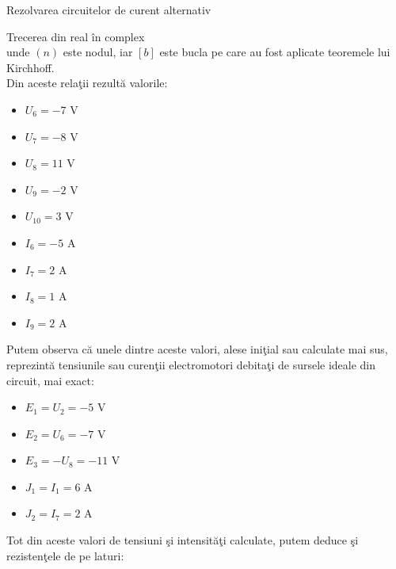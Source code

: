 \documentclass[a4paper]{article}
\begin{document}
\begin{section}{Rezolvarea circuitelor de curent alternativ}
\begin{subsection}{Trecerea din real \^ in complex\\}
unde $ (n) $ este nodul, iar $ [b] $ este bucla pe care au fost aplicate teoremele lui Kirchhoff. \\[0.5cm]
Din aceste rela\c tii rezult\u a valorile: 

\begin{multicols}{2}
\begin{large}
	\begin{itemize}
		\item $ U_6 = -7 $ V
		\item $ U_7 = -8 $ V
		\item $ U_8 = 11 $ V
		\item $ U_9 = -2 $ V
		\item $ U_{10} = 3 $ V

		\item $ I_6 = -5 $ A
		\item $ I_7 = 2 $ A
		\item $ I_8 = 1 $ A
		\item $ I_9 = 2 $ A
	\end{itemize} \par
\end{large}
\end{multicols}

	Putem observa c\u a unele dintre aceste valori, alese ini\c tial sau calculate mai sus, reprezint\u a tensiunile sau curen\c tii electromotori debita\c ti de sursele ideale din circuit, mai exact:

\begin{multicols}{2}
\begin{large}
	\begin{itemize}
		\item $ E_1 = U_2 = -5$ V
		\item $ E_2 = U_6 = -7$ V
		\item $ E_3 = -U_8 = -11$  V
		
		\item $ J_1 = I_1 = 6 $ A
		\item $ J_2 = I_7 = 2 $ A \\
	\end{itemize} \par
\end{large}
\end{multicols}

	Tot din aceste valori de tensiuni \c si intensit\u a\c ti calculate, putem deduce \c si rezisten\c tele de pe laturi:


\end{subsection}
\end{section}
\end{document}

